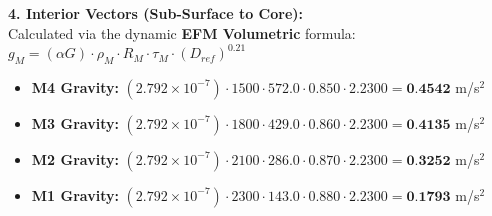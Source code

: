 \documentclass[11pt, a4paper]{article}
\begin{document}
  \vspace{0.5em}
  \noindent \textbf{4. Interior Vectors (Sub-Surface to Core):} \\[0.5em]
  \hspace*{1em} Calculated via the dynamic \textbf{EFM Volumetric} formula: $g_M = (\alpha G) \cdot \rho_{M} \cdot R_M \cdot \tau_M \cdot (D_{ref})^{0.21}$
  \begin{itemize}
    \item \textbf{M4 Gravity:} $(2.792 \times 10^{-7}) \cdot 1500 \cdot 572.0 \cdot 0.850 \cdot 2.2300 = \textbf{0.4542}$ m/s$^2$
    \item \textbf{M3 Gravity:} $(2.792 \times 10^{-7}) \cdot 1800 \cdot 429.0 \cdot 0.860 \cdot 2.2300 = \textbf{0.4135}$ m/s$^2$
    \item \textbf{M2 Gravity:} $(2.792 \times 10^{-7}) \cdot 2100 \cdot 286.0 \cdot 0.870 \cdot 2.2300 = \textbf{0.3252}$ m/s$^2$
    \item \textbf{M1 Gravity:} $(2.792 \times 10^{-7}) \cdot 2300 \cdot 143.0 \cdot 0.880 \cdot 2.2300 = \textbf{0.1793}$ m/s$^2$
  \end{itemize}
\end{document}
